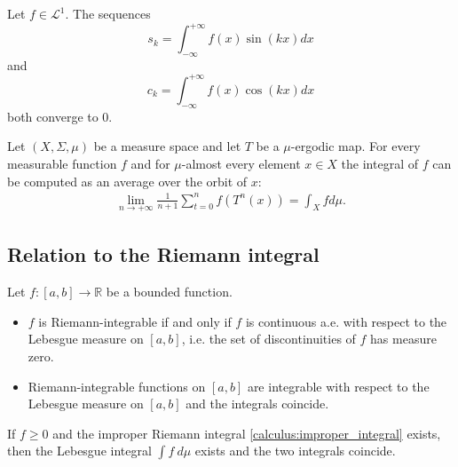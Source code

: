     \begin{theorem}\label{lebesgue:riemann_lebesue_lemma}
        Let $f\in\mathcal{L}^1$. The sequences \[s_k = \int_{-\infty}^{+\infty}f(x)\sin(kx)dx\] and \[c_k = \int_{-\infty}^{+\infty}f(x)\cos(kx)dx\] both converge to 0.
    \end{theorem}

    \begin{theorem}\label{lebesgue:ergodic}
        Let $(X, \Sigma, \mu)$ be a measure space and let $T$ be a $\mu$-ergodic map. For every measurable function $f$ and for $\mu$-almost every element $x\in X$ the integral of $f$ can be computed as an average over the orbit of $x$:
        \begin{gather}
            \lim_{n\rightarrow+\infty}\frac{1}{n+1}\sum_{t=0}^nf(T^n(x)) = \int_Xfd\mu.
        \end{gather}
    \end{theorem}

\subsection{Relation to the Riemann integral}

    \begin{property}
        Let $f:[a,b]\rightarrow\mathbb{R}$ be a bounded function.
        \begin{itemize}
            \item $f$ is Riemann-integrable if and only if $f$ is continuous a.e. with respect to the Lebesgue measure on $[a,b]$, i.e. the set of discontinuities of $f$ has measure zero.
            \item Riemann-integrable functions on $[a,b]$ are integrable with respect to the Lebesgue measure on $[a,b]$ and the integrals coincide.
        \end{itemize}
    \end{property}

    \begin{property}
        If $f\geq0$ and the improper Riemann integral \ref{calculus:improper_integral} exists, then the Lebesgue integral $\int f\ d\mu$ exists and the two integrals coincide.
    \end{property}